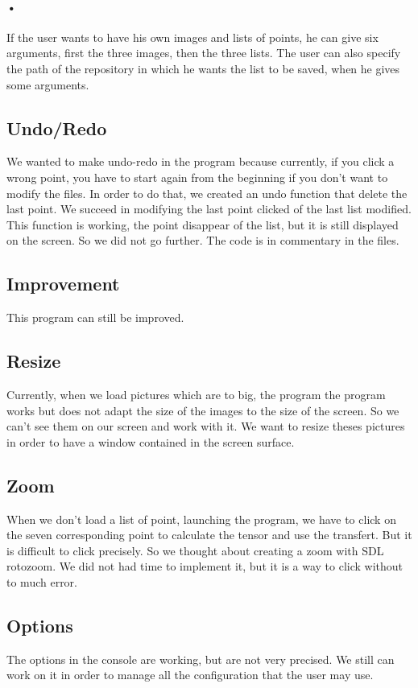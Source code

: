 \documentclass{report}
\begin{document}
\paragraph{•}
If the user wants to have his own images and lists of points, he can give six arguments, first the three images, then the three lists. 
The user can also specify the path of the repository in which he wants the list to be saved, when he gives some arguments. 
\newpage
\textcolor{subtitle}{\subsection{Undo/Redo}}
We wanted to make undo-redo in the program because currently, if you click a wrong point, you have to start again from the beginning if you don't want to modify the files. In order to do that, we created an undo function that delete the last point. We succeed in modifying the last point clicked of the last list modified. This function is working, the point disappear of the list, but it is still displayed on the screen. 
So we did not go further. The code is in commentary in the files. 

\textcolor{title}{\section{Improvement}}
This program can still be improved. 

\textcolor{subtitle}{\subsection{Resize }}
Currently, when we load pictures which are to big, the program the program works but does not adapt the size of the images to the size of the screen. So we can't see them on our screen and work with it. 
We want to resize theses pictures in order to have a window contained in the screen surface. 

\textcolor{subtitle}{\subsection{Zoom}}
When we don't load a list of point, launching the program, we have to click on the seven corresponding point to calculate the tensor and use the transfert. But it is difficult to click precisely. So we thought about creating a zoom with SDL rotozoom. We did not had time to implement it, but it is a way to click without to much error.

\textcolor{subtitle}{\subsection{Options}}
The options in the console are working, but are not very precised. We still can work on it in order to manage all the configuration that the user may use. 
\end{document}
